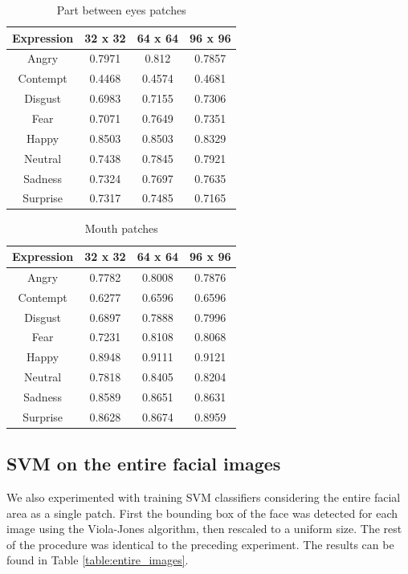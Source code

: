 \begin{table}
\caption{Part between eyes patches}
\label{table:between_eyes}

\begin{tabular}{| c | c | c | c |}
\hline
Expression & 32 x 32 &  64 x 64  & 96 x 96  \\

\hline
Angry & 0.7971 & 0.812 & 0.7857 \\
Contempt & 0.4468 & 0.4574 & 0.4681 \\
Disgust & 0.6983 & 0.7155 & 0.7306 \\
Fear & 0.7071 & 0.7649 & 0.7351 \\
Happy & 0.8503 & 0.8503 & 0.8329 \\
Neutral & 0.7438 & 0.7845 & 0.7921 \\
Sadness & 0.7324 & 0.7697 & 0.7635 \\
Surprise & 0.7317 & 0.7485 & 0.7165 \\

\hline
\end{tabular}
\end{table}


\begin{table}
\caption{Mouth patches}
\label{table:mouth}

\begin{tabular}{| c | c | c | c |}
\hline
Expression & 32 x 32 &  64 x 64  & 96 x 96  \\

\hline
Angry	&	0.7782	&	0.8008	&	0.7876	\\
Contempt	&	0.6277	&	0.6596	& 0.6596 \\
Disgust	&	0.6897	&	0.7888	&	0.7996	\\
Fear	&	0.7231	&	0.8108	&	0.8068	\\
Happy	&	0.8948	&	0.9111	&	0.9121	\\
Neutral	&	0.7818	&	0.8405	&	0.8204	\\
Sadness	&	0.8589	&	0.8651	&	0.8631	\\
Surprise &	0.8628	&	0.8674	&	0.8959	\\

\hline
\end{tabular}
\end{table}

\subsection{SVM on the entire facial images}
We also experimented with training SVM classifiers considering the entire facial area as a single patch. First the bounding box of the face was detected
for each image using the Viola-Jones algorithm, then rescaled to a uniform size. %
The rest of the procedure was identical to the preceding experiment. The results can be found in Table \ref{table:entire_images}.

